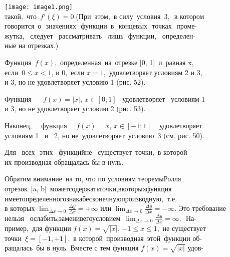 \documentclass[14pt]{extarticle}
\begin{document}
\texttt{[image: image1.png]}\\
такой,\, что\, $f'(\xi)=0$.(При\, этом,\, в силу\, условия\, 3,\,\, в котором\\
говорится\, о\,\,  значениях\,\, функции\, в\,\,  концевых\,\, точках\,\, проме-\\
жутка,\,\,\, следует\,\,\, рассматривать\,\,\, лишь\,\, функции,\,\,\, определен-\\
ные на отрезках.)
\par
Функция\, $f(x)$,\, определенная\, на\, отрезке [0, 1]\, и\, равная x,\\
если\, $0 \leq x\! < 1$, и 0,\, если $x = 1$,\, удовлетворяет условиям 2 и 3,\\
и 3, но не удовлетворяет условию 1 (рис. 52).
\par
Функция~~\,\, $f(x)=|x|$, $x \in [0; 1]$~ удовлетворяет~ условиям 1\\
и 3, но не удовлетворяет условию 2 (рис. 53).
\par
Наконец,~\,\,\, функция~\,\,\, $f(x)=x$, $x \in [-1; 1]$~\,\, удовлетворяет\\
условиям 1~ и~ 2, но не\, удовлетворяет\, условию\, 3 (см. рис. 50).
\par
Для~ всех\,\, этих~ функций\space не~ существует\, точки,\, в которой\\
их производная обращалась бы в нуль.
\par
Обратим внимание\, на то, что по условиям теоремы\space\space Ролля\\
отрезок\, [a, b]\, может\space\space содержать\space\space точки,\space\space в\space\space которых\space\space функция\\
имеет\space\space определенного\space\space знака\space\space бесконечную\space\space\space производную,\space\, т.е.\\
в которых $\displaystyle{\lim_{\Delta x \to 0}} \frac{\Delta y}{\Delta x} = +\infty$ или $\displaystyle{\lim_{\Delta x \to 0}} \frac{\Delta y}{\Delta x} = -\infty$. Это требование\\
нельзя\,\,\, ослабить,\space\space заменив\space\space его\space\space условием\space\, $\displaystyle{\lim_{\Delta x \to 0}} \frac{\Delta y}{\Delta x} = \infty$.\,\, На-\\
пример,\, для функции $f(x) = \sqrt{|x|}$, $-1 \leq x \leq 1$,\, не существует\\
точки\,  $\xi = [-1, +1]$,\, в которой\, производная\, этой\, функции об-\\
ращалась\, бы в нуль. Вместе с тем функция $f(x) = \sqrt{|x|}$ удов-\\
\end{document}
